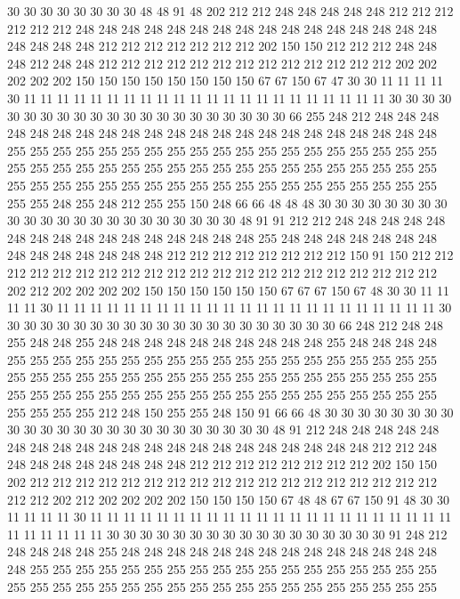 30 30 30 30 30 30 30 30 48 48 91 48 202 212 212 248 248 248 248 248
212 212 212 212 212 212 248 248 248 248 248 248 248 248 248 248 248 248 248 248
248 248 248 248 248 248 212 212 212 212 212 212 212 202 150 150 212 212 212 248
248 248 212 248 248 212 212 212 212 212 212 212 212 212 212 212 212 212 202 202
202 202 202 150 150 150 150 150 150 150 150 67 67 150 67 47 30 30 11 11
11 11 30 11 11 11 11 11 11 11 11 11 11 11 11 11 11 11 11 11
11 11 11 11 11 30 30 30 30 30 30 30 30 30 30 30 30 30 30 30
30 30 30 30 30 30 66 255 248 212 248 248 248 248 248 248 248 248 248 248
248 248 248 248 248 248 248 248 248 248 248 248 255 255 255 255 255 255 255 255
255 255 255 255 255 255 255 255 255 255 255 255 255 255 255 255 255 255 255 255
255 255 255 255 255 255 255 255 255 255 255 255 255 255 255 255 255 255 255 255
255 255 255 255 255 255 255 255 255 255 255 248 255 248 212 255 255 150 248 66
66 48 48 48 30 30 30 30 30 30 30 30 30 30 30 30 30 30 30 30
30 30 30 30 30 30 48 91 91 212 212 248 248 248 248 248 248 248 248 248
248 248 248 248 248 248 248 255 248 248 248 248 248 248 248 248 248 248 248 248
248 248 212 212 212 212 212 212 212 212 150 91 150 212 212 212 212 212 212 212
212 212 212 212 212 212 212 212 212 212 212 212 212 212 202 212 202 202 202 202
150 150 150 150 150 150 67 67 67 150 67 48 30 30 11 11 11 11 30 11
11 11 11 11 11 11 11 11 11 11 11 11 11 11 11 11 11 11 11 11
11 11 30 30 30 30 30 30 30 30 30 30 30 30 30 30 30 30 30 30
30 30 30 66 248 212 248 248 255 248 248 255 248 248 248 248 248 248 248 248
248 248 255 248 248 248 248 255 255 255 255 255 255 255 255 255 255 255 255 255
255 255 255 255 255 255 255 255 255 255 255 255 255 255 255 255 255 255 255 255
255 255 255 255 255 255 255 255 255 255 255 255 255 255 255 255 255 255 255 255
255 255 255 255 255 255 255 255 212 248 150 255 255 248 150 91 66 66 48 30
30 30 30 30 30 30 30 30 30 30 30 30 30 30 30 30 30 30 30 30
30 30 30 48 91 212 248 248 248 248 248 248 248 248 248 248 248 248 248 248
248 248 248 248 248 248 248 212 212 248 248 248 248 248 248 248 248 248 212 212
212 212 212 212 212 212 202 150 150 202 212 212 212 212 212 212 212 212 212 212
212 212 212 212 212 212 212 212 212 212 202 212 202 202 202 202 150 150 150 150
67 48 48 67 67 150 91 48 30 30 11 11 11 11 30 11 11 11 11 11
11 11 11 11 11 11 11 11 11 11 11 11 11 11 11 11 11 11 11 11
11 11 11 30 30 30 30 30 30 30 30 30 30 30 30 30 30 30 30 30
91 248 212 248 248 248 248 255 248 248 248 248 248 248 248 248 248 248 248 248
248 248 248 255 255 255 255 255 255 255 255 255 255 255 255 255 255 255 255 255
255 255 255 255 255 255 255 255 255 255 255 255 255 255 255 255 255 255 255 255
